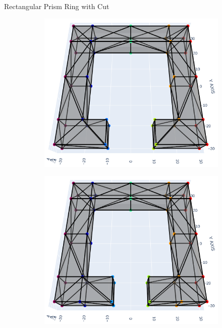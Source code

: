 \documentclass[xcolor=dvipsnames, aspectratio=169]{beamer}
\begin{document}
\begin{frame}{Rectangular Prism Ring with Cut}
\begin{figure}
\begin{subfigure}[b]{0.15\textwidth}
\includegraphics[width=\linewidth]{Final Run, (rect prism ring 20 mm cut) meshpy plotly screenshot.png}
\end{subfigure}
\begin{subfigure}[b]{0.15\textwidth}
\includegraphics[width=\linewidth]{Final Run, (rect prism ring 15 mm cut) meshpy plotly screenshot.png}
\end{subfigure}
\\[3pt]

\end{figure}
\end{frame}
\end{document}
